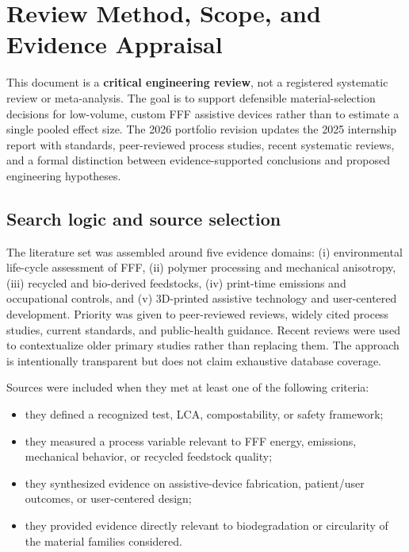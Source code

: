 \documentclass[11pt]{article}
\begin{document}
\section{Review Method, Scope, and Evidence Appraisal}

This document is a \textbf{critical engineering review}, not a registered systematic review or meta-analysis. The goal is to support defensible material-selection decisions for low-volume, custom FFF assistive devices rather than to estimate a single pooled effect size. The 2026 portfolio revision updates the 2025 internship report with standards, peer-reviewed process studies, recent systematic reviews, and a formal distinction between evidence-supported conclusions and proposed engineering hypotheses.

\subsection{Search logic and source selection}

The literature set was assembled around five evidence domains: (i) environmental life-cycle assessment of FFF, (ii) polymer processing and mechanical anisotropy, (iii) recycled and bio-derived feedstocks, (iv) print-time emissions and occupational controls, and (v) 3D-printed assistive technology and user-centered development. Priority was given to peer-reviewed reviews, widely cited process studies, current standards, and public-health guidance. Recent reviews were used to contextualize older primary studies rather than replacing them. The approach is intentionally transparent but does not claim exhaustive database coverage.

Sources were included when they met at least one of the following criteria:
\begin{itemize}
  \item they defined a recognized test, LCA, compostability, or safety framework;
  \item they measured a process variable relevant to FFF energy, emissions, mechanical behavior, or recycled feedstock quality;
  \item they synthesized evidence on assistive-device fabrication, patient/user outcomes, or user-centered design;
  \item they provided evidence directly relevant to biodegradation or circularity of the material families considered.
\end{itemize}
\end{document}
